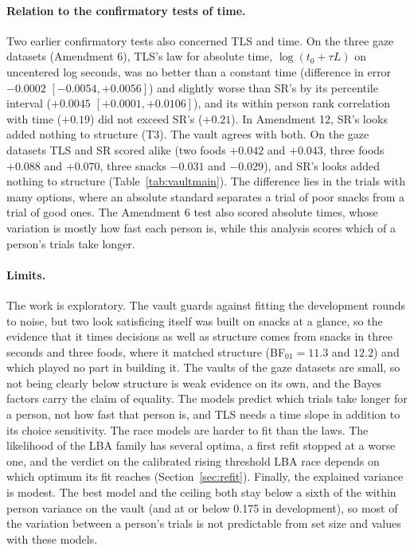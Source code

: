 \documentclass[11pt]{article}
\begin{document}
\paragraph{Relation to the confirmatory tests of time.} Two earlier confirmatory tests also concerned TLS and time. On the three gaze datasets (Amendment 6), TLS's law for absolute time, $\log(t_0 + \tau L)$ on uncentered log seconds, was no better than a constant time (difference in error $-0.0002$ $[-0.0054, +0.0056]$) and slightly worse than SR's by its percentile interval ($+0.0045$ $[+0.0001, +0.0106]$), and its within person rank correlation with time ($+0.19$) did not exceed SR's ($+0.21$). In Amendment 12, SR's looks added nothing to structure (T3). The vault agrees with both. On the gaze datasets TLS and SR scored alike (two foods $+0.042$ and $+0.043$, three foods $+0.088$ and $+0.070$, three snacks $-0.031$ and $-0.029$), and SR's looks added nothing to structure (Table~\ref{tab:vaultmain}). The difference lies in the trials with many options, where an absolute standard separates a trial of poor snacks from a trial of good ones. The Amendment 6 test also scored absolute times, whose variation is mostly how fast each person is, while this analysis scores which of a person's trials take longer.

\paragraph{Limits.} The work is exploratory. The vault guards against fitting the development rounds to noise, but two look satisficing itself was built on snacks at a glance, so the evidence that it times decisions as well as structure comes from snacks in three seconds and three foods, where it matched structure (BF$_{01} = 11.3$ and $12.2$) and which played no part in building it. The vaults of the gaze datasets are small, so not being clearly below structure is weak evidence on its own, and the Bayes factors carry the claim of equality. The models predict which trials take longer for a person, not how fast that person is, and TLS needs a time slope in addition to its choice sensitivity. The race models are harder to fit than the laws. The likelihood of the LBA family has several optima, a first refit stopped at a worse one, and the verdict on the calibrated rising threshold LBA race depends on which optimum its fit reaches (Section~\ref{sec:refit}). Finally, the explained variance is modest. The best model and the ceiling both stay below a sixth of the within person variance on the vault (and at or below 0.175 in development), so most of the variation between a person's trials is not predictable from set size and values with these models.
\end{document}

